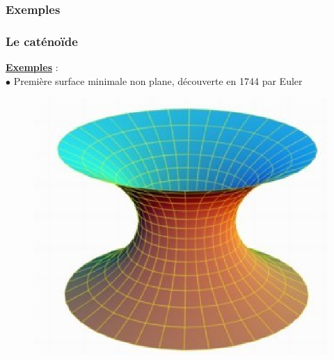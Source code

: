 \documentclass{beamer}
\newcommand{\gs}[1]{\textbf{\underline{#1}}}
\begin{document}
\subsubsection{Exemples}

\begin{frame}
\frametitle{Le caténoïde}
\gs{Exemples} : 
\pause \\
$\bullet$ Première surface minimale non plane, découverte en 1744 par Euler
\begin{figure}[h!]
      \centering 
      \includegraphics[scale=0.5]{3.eps}
\end{figure}
\end{frame}
\end{document}

